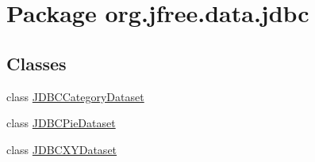 \hypertarget{namespaceorg_1_1jfree_1_1data_1_1jdbc}{}\section{Package org.\+jfree.\+data.\+jdbc}
\label{namespaceorg_1_1jfree_1_1data_1_1jdbc}
\subsection*{Classes}
\begin{DoxyCompactItemize}
\item 
class \mbox{\hyperlink{classorg_1_1jfree_1_1data_1_1jdbc_1_1_j_d_b_c_category_dataset}{J\+D\+B\+C\+Category\+Dataset}}
\item 
class \mbox{\hyperlink{classorg_1_1jfree_1_1data_1_1jdbc_1_1_j_d_b_c_pie_dataset}{J\+D\+B\+C\+Pie\+Dataset}}
\item 
class \mbox{\hyperlink{classorg_1_1jfree_1_1data_1_1jdbc_1_1_j_d_b_c_x_y_dataset}{J\+D\+B\+C\+X\+Y\+Dataset}}
\end{DoxyCompactItemize}
